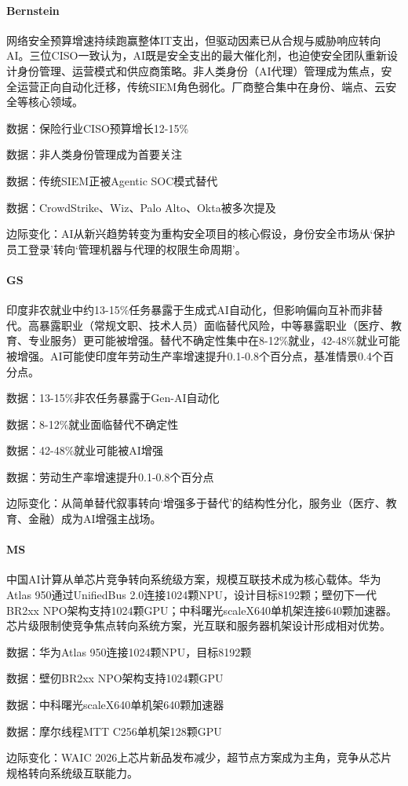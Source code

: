 \documentclass[11pt]{ctexart}
\begin{document}
\paragraph{Bernstein} 网络安全预算增速持续跑赢整体IT支出，但驱动因素已从合规与威胁响应转向AI。三位CISO一致认为，AI既是安全支出的最大催化剂，也迫使安全团队重新设计身份管理、运营模式和供应商策略。非人类身份（AI代理）管理成为焦点，安全运营正向自动化迁移，传统SIEM角色弱化。厂商整合集中在身份、端点、云安全等核心领域。
{\small\color{refgray}数据：保险行业CISO预算增长12-15\%\par}
{\small\color{refgray}数据：非人类身份管理成为首要关注\par}
{\small\color{refgray}数据：传统SIEM正被Agentic SOC模式替代\par}
{\small\color{refgray}数据：CrowdStrike、Wiz、Palo Alto、Okta被多次提及\par}
{\small\color{refgray}边际变化：AI从新兴趋势转变为重构安全项目的核心假设，身份安全市场从‘保护员工登录’转向‘管理机器与代理的权限生命周期’。\par}
\paragraph{GS} 印度非农就业中约13-15\%任务暴露于生成式AI自动化，但影响偏向互补而非替代。高暴露职业（常规文职、技术人员）面临替代风险，中等暴露职业（医疗、教育、专业服务）更可能被增强。替代不确定性集中在8-12\%就业，42-48\%就业可能被增强。AI可能使印度年劳动生产率增速提升0.1-0.8个百分点，基准情景0.4个百分点。
{\small\color{refgray}数据：13-15\%非农任务暴露于Gen-AI自动化\par}
{\small\color{refgray}数据：8-12\%就业面临替代不确定性\par}
{\small\color{refgray}数据：42-48\%就业可能被AI增强\par}
{\small\color{refgray}数据：劳动生产率增速提升0.1-0.8个百分点\par}
{\small\color{refgray}边际变化：从简单替代叙事转向‘增强多于替代’的结构性分化，服务业（医疗、教育、金融）成为AI增强主战场。\par}
\paragraph{MS} 中国AI计算从单芯片竞争转向系统级方案，规模互联技术成为核心载体。华为Atlas 950通过UnifiedBus 2.0连接1024颗NPU，设计目标8192颗；壁仞下一代BR2xx NPO架构支持1024颗GPU；中科曙光scaleX640单机架连接640颗加速器。芯片级限制使竞争焦点转向系统方案，光互联和服务器机架设计形成相对优势。
{\small\color{refgray}数据：华为Atlas 950连接1024颗NPU，目标8192颗\par}
{\small\color{refgray}数据：壁仞BR2xx NPO架构支持1024颗GPU\par}
{\small\color{refgray}数据：中科曙光scaleX640单机架640颗加速器\par}
{\small\color{refgray}数据：摩尔线程MTT C256单机架128颗GPU\par}
{\small\color{refgray}边际变化：WAIC 2026上芯片新品发布减少，超节点方案成为主角，竞争从芯片规格转向系统级互联能力。\par}
\end{document}
